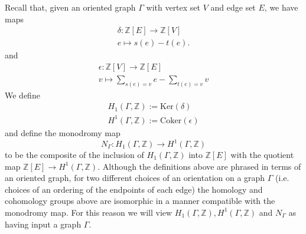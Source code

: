 \documentclass[11pt]{amsart}
\def\Z{\mathbb Z}
\theoremstyle{plain}
\theoremstyle{definition}
\newcommand{\Coker}{\mathrm{Coker}}
\newcommand{\Ker}{\mathrm{Ker}}
\begin{document}
Recall that, given an oriented graph $\Gamma$ with vertex set $V$ and edge set $E$, we have maps
\begin{align*}
\delta :\Z [E]\to \Z [V] \\
e\mapsto s(e)-t(e).
\end{align*}
and 
\begin{align*}
\epsilon :\Z [V]\to \Z [E] \\
v \mapsto \sum _{s(e)=v}e-\sum _{t(e)=v}v
\end{align*}
We define 
\begin{align*}
H_1 (\Gamma ,\Z ):=\Ker (\delta ) \\
H^1 (\Gamma ,\Z ):=\Coker (\epsilon )
\end{align*}
and define the monodromy map
\[
N_{\Gamma }:H_1 (\Gamma ,\Z )\to H^1 (\Gamma ,\Z )
\]
to be the composite of the inclusion of $H_1 (\Gamma ,\Z )$ into $\Z [E]$ with the quotient map $\Z [E]\to H^1 (\Gamma ,\Z )$. Although the definitions above are phrased in terms of an oriented graph, for two different choices of an orientation on a graph $\Gamma $ (i.e. choices of an ordering of the endpoints of each edge) the homology and cohomology groups above are isomorphic in a manner compatible with the monodromy map. For this reason we will view $H_1 (\Gamma ,\Z ),H^1 (\Gamma ,\Z )$ and $N_{\Gamma }$ as having input a graph $\Gamma $.
\end{document}
